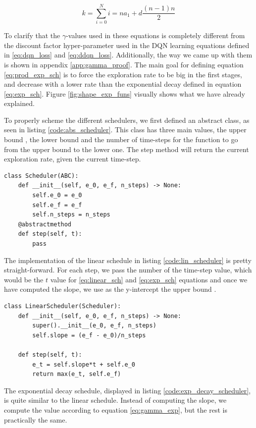 \begin{equation}
	\label{eq:k_sum}
	k = \sum_{i=0}^{N} i  = n a_1 + d \frac{(n-1)n}{2}
\end{equation}

To clarify that the $\gamma$-values used in these equations is completely different from the discount factor hyper-parameter used in the DQN learning equations defined in \ref{eq:dqn_loss} and \ref{eq:ddqn_loss}. Additionally, the way we came up with them is shown in appendix \ref{app:gamma_proof}. The main goal for defining equation \ref{eq:prod_exp_sch} is to force the exploration rate to be big in the first stages, and decrease with a lower rate than the exponential decay defined in equation \ref{eq:exp_sch}. Figure \ref{fig:shape_exp_funs} visually shows what we have already explained.

To properly scheme the different schedulers, we first defined an abstract class, as seen in listing \ref{code:abs_scheduler}. This class has three main values, the upper bound , the lower bound  and the number of time-steps for the function to go from the upper bound to the lower one. The step method will return the current exploration rate, given the current time-step.
\begin{lstlisting}[caption={Abstract class for the scheduler}, label={code:abs_scheduler}]
class Scheduler(ABC):
	def __init__(self, e_0, e_f, n_steps) -> None:
		self.e_0 = e_0
		self.e_f = e_f
		self.n_steps = n_steps
	@abstractmethod
	def step(self, t):
		pass
\end{lstlisting}

The implementation of the linear schedule in listing \ref{code:lin_scheduler} is pretty straight-forward. For each step, we pass the number of the time-step value, which would be the $t$ value for \ref{eq:linear_sch} and \ref{eq:exp_sch} equations and once we have computed the slope, we use as the y-intercept the upper bound . 

\begin{lstlisting}[caption={Linear scheduler class}, label={code:lin_scheduler}]
class LinearScheduler(Scheduler):
	def __init__(self, e_0, e_f, n_steps) -> None:
		super().__init__(e_0, e_f, n_steps)
		self.slope = (e_f - e_0)/n_steps
	
	def step(self, t):
		e_t = self.slope*t + self.e_0
		return max(e_t, self.e_f)
\end{lstlisting}

The exponential decay schedule, displayed in listing \ref{code:exp_decay_scheduler}, is quite similar to the linear schedule. Instead of computing the slope, we compute the  value according to equation \ref{eq:gamma_exp}, but the rest is practically the same.

